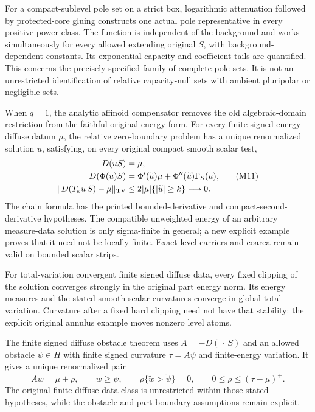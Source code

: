 \documentclass[11pt,a4paper]{article}
\numberwithin{equation}{section}
\theoremstyle{definition}
\theoremstyle{remark}
\begin{document}
For a compact-sublevel pole set on a strict box,
logarithmic attenuation followed by protected-core
gluing constructs one actual pole representative
in every positive power class.
The function is independent of the background
and works simultaneously for every allowed
extending original $S$, with background-dependent
constants.  Its exponential capacity and coefficient
tails are quantified.
This concerns the precisely specified family of
complete pole sets.  It is not an unrestricted
identification of relative capacity-null sets with
ambient pluripolar or negligible sets.

When $q=1$, the analytic affinoid compensator
removes the old algebraic-domain restriction from
the faithful original energy form.
For every finite signed energy-diffuse datum $\mu$,
the relative zero-boundary problem has a unique
renormalized solution $u$, satisfying, on every
original compact smooth scalar test,
\[
 \begin{split}
 D(uS)&=\mu,\\
 D(\Phi(u)S)&=\Phi'(\widetilde u)\mu
                  +\Phi''(\widetilde u)\Gamma_S(u),\\
 \|D(T_ku\,S)-\mu\|_{\rm TV}
                       &\leq2|\mu|\{|\widetilde u|\geq k\}\longrightarrow0.
 \end{split}
 \tag{M11}
\]
The chain formula has the printed bounded-derivative
and compact-second-derivative hypotheses.
The compatible unweighted energy of an arbitrary
measure-data solution is only sigma-finite in
general; a new explicit example proves that it
need not be locally finite.
Exact level carriers and coarea remain valid on
bounded scalar strips.

For total-variation convergent finite signed diffuse data,
every fixed clipping of the solution converges strongly
in the original part energy norm. Its energy measures and
the stated smooth scalar curvatures converge in global
total variation. Curvature after a fixed hard clipping
need not have that stability: the explicit original
annulus example moves nonzero level atoms.

The finite signed diffuse obstacle theorem uses
$A=-D(\,\cdot\,S)$ and an allowed obstacle $\psi\in H$
with finite signed curvature $\tau=A\psi$ and finite-energy
variation. It gives a unique renormalized pair
\[
 Aw=\mu+\rho,\qquad w\geq\psi,\qquad
 \rho\{\widetilde w>\widetilde\psi\}=0,\qquad
 0\leq\rho\leq(\tau-\mu)^+.
 \tag{M15}
\]
The original finite-diffuse data class is unrestricted
within those stated hypotheses, while the obstacle and
part-boundary assumptions remain explicit.
\end{document}

